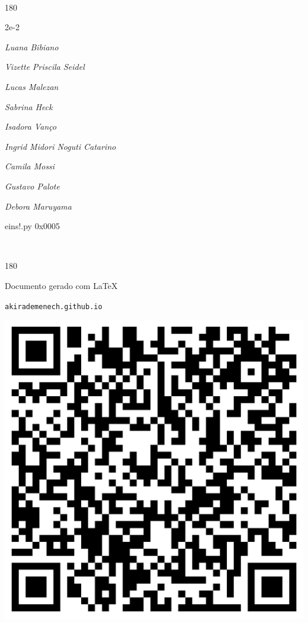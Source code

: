 \documentclass[12pt]{article}
\begin{document}
	\ 
	\vfill
	\begin{turn}{180}	
		\begin{minipage}{\textwidth}
		  	\ttfamily %
			\centering
			{\Huge 2e-2}
		  
			\hfill
		  
			

\textit{\small Luana Bibiano}

\textit{\small Vizette Priscila Seidel}

\textit{\small Lucas Malezan}

\textit{\small Sabrina Heck}

\textit{\small Isadora Vanço}

\textit{\small Ingrid Midori Noguti Catarino}

\textit{\small Camila Mossi}

\textit{\small Gustavo Palote}

\textit{\small Debora Maruyama}

\bigskip

eins!.py
0x0005


		\end{minipage}	
	\end{turn}
	\vfill
	\

\pagebreak

	\begin{turn}{180}	
		\begin{minipage}{\textwidth}		  
		  Documento gerado com \LaTeX			
		  
		  \texttt{akirademenech.github.io}

		  \includegraphics[height=0.3\textheight]{2e-2.pdf}

		\end{minipage}	
	\end{turn}  
		  
\end{document}
